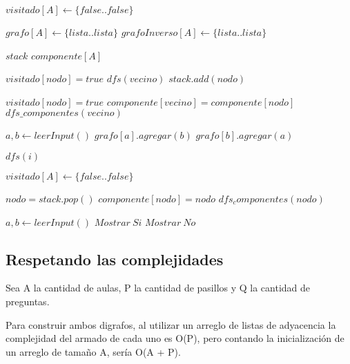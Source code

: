 \begin{algorithmic}

\State $visitado[A] \gets \{false..false\}$

\State $grafo[A] \gets \{lista..lista\}$
\State $grafoInverso[A] \gets \{lista..lista\}$

\State $stack$
\State $componente[A]$

	\State $visitado[nodo] = true$
			\State $dfs(vecino)$
		\EndIf
	\EndFor
	\State $stack.add(nodo)$
\EndFunction

	\State $visitado[nodo] = true$
			\State $componente[vecino] = componente[nodo]$
			\State $dfs\_componentes(vecino)$
		\EndIf
	\EndFor
\EndFunction


    	\State $a, b \gets leerInput()$
    	\State $grafo[a].agregar(b)$
    	\State $grafo[b].agregar(a)$
    \EndFor

    		\State $dfs(i)$
    	\EndIf
    \EndFor

    \State $visitado[A] \gets \{false..false\}$

    	\State $nodo = stack.pop()$
    		\State $componente[nodo] = nodo$
    		\State $dfs_componentes(nodo)$
    	\EndIf
    \EndWhile

    	\State $a, b \gets leerInput()$
    		\State $Mostrar\ Si$
    	\EndIf
    		\State $Mostrar\ No$
    	\EndIf   	
    \EndFor

\EndFunction

\end{algorithmic}


\subsection{Respetando las complejidades}

Sea A la cantidad de aulas, P la cantidad de pasillos y Q la cantidad de preguntas.\newline

Para construir ambos digrafos, al utilizar un arreglo de listas de adyacencia la complejidad del armado de cada uno es O(P), pero contando la inicialización de un arreglo de tamaño A, sería O(A + P).\newline

